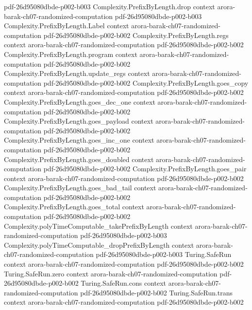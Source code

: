 \begin{theorem}
  {pdf-26d95080dbde-p002-b003}
\proofstep
  {Complexity.PrefixByLength.drop}
  {context}
  {arora-barak-ch07-randomized-computation}
  {pdf-26d95080dbde-p002-b003}
\proofstep
  {Complexity.PrefixByLength.Label}
  {context}
  {arora-barak-ch07-randomized-computation}
  {pdf-26d95080dbde-p002-b002}
\proofstep
  {Complexity.PrefixByLength.regs}
  {context}
  {arora-barak-ch07-randomized-computation}
  {pdf-26d95080dbde-p002-b002}
\proofstep
  {Complexity.PrefixByLength.program}
  {context}
  {arora-barak-ch07-randomized-computation}
  {pdf-26d95080dbde-p002-b002}
\proofstep
  {Complexity.PrefixByLength.update_regs}
  {context}
  {arora-barak-ch07-randomized-computation}
  {pdf-26d95080dbde-p002-b002}
\proofstep
  {Complexity.PrefixByLength.goes_copy}
  {context}
  {arora-barak-ch07-randomized-computation}
  {pdf-26d95080dbde-p002-b002}
\proofstep
  {Complexity.PrefixByLength.goes_dec_one}
  {context}
  {arora-barak-ch07-randomized-computation}
  {pdf-26d95080dbde-p002-b002}
\proofstep
  {Complexity.PrefixByLength.goes_payload}
  {context}
  {arora-barak-ch07-randomized-computation}
  {pdf-26d95080dbde-p002-b002}
\proofstep
  {Complexity.PrefixByLength.goes_inc_one}
  {context}
  {arora-barak-ch07-randomized-computation}
  {pdf-26d95080dbde-p002-b002}
\proofstep
  {Complexity.PrefixByLength.goes_doubled}
  {context}
  {arora-barak-ch07-randomized-computation}
  {pdf-26d95080dbde-p002-b002}
\proofstep
  {Complexity.PrefixByLength.goes_pair}
  {context}
  {arora-barak-ch07-randomized-computation}
  {pdf-26d95080dbde-p002-b002}
\proofstep
  {Complexity.PrefixByLength.goes_bad_tail}
  {context}
  {arora-barak-ch07-randomized-computation}
  {pdf-26d95080dbde-p002-b002}
\proofstep
  {Complexity.PrefixByLength.goes_total}
  {context}
  {arora-barak-ch07-randomized-computation}
  {pdf-26d95080dbde-p002-b002}
\proofstep
  {Complexity.polyTimeComputable_takePrefixByLength}
  {context}
  {arora-barak-ch07-randomized-computation}
  {pdf-26d95080dbde-p002-b003}
\proofstep
  {Complexity.polyTimeComputable_dropPrefixByLength}
  {context}
  {arora-barak-ch07-randomized-computation}
  {pdf-26d95080dbde-p002-b003}
\proofstep
  {Turing.SafeRun}
  {context}
  {arora-barak-ch07-randomized-computation}
  {pdf-26d95080dbde-p002-b002}
\proofstep
  {Turing.SafeRun.zero}
  {context}
  {arora-barak-ch07-randomized-computation}
  {pdf-26d95080dbde-p002-b002}
\proofstep
  {Turing.SafeRun.cons}
  {context}
  {arora-barak-ch07-randomized-computation}
  {pdf-26d95080dbde-p002-b002}
\proofstep
  {Turing.SafeRun.trans}
  {context}
  {arora-barak-ch07-randomized-computation}
  {pdf-26d95080dbde-p002-b002}

\end{theorem}
